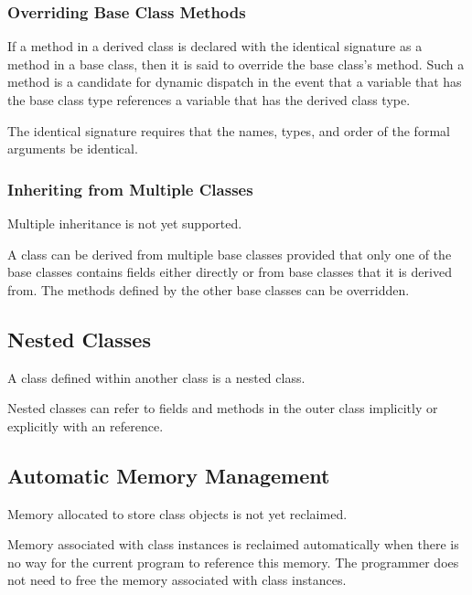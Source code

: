 \subsubsection{Overriding Base Class Methods}
\label{Overriding_Base_Class_Methods}

If a method in a derived class is declared with the identical
signature as a method in a base class, then it is said to override the
base class's method.  Such a method is a candidate for dynamic
dispatch in the event that a variable that has the base class type
references a variable that has the derived class type.

The identical signature requires that the names, types, and order of
the formal arguments be identical.

\subsubsection{Inheriting from Multiple Classes}
\label{Inheriting_from_Multiple_Classes}

\begin{status}
Multiple inheritance is not yet supported.
\end{status}

A class can be derived from multiple base classes provided that only
one of the base classes contains fields either directly or from base
classes that it is derived from.  The methods defined by the other
base classes can be overridden.

\subsection{Nested Classes}
\label{Nested_Classes}

A class defined within another class is a nested class.

Nested classes can refer to fields and methods in the outer class
implicitly or explicitly with an  reference.

\subsection{Automatic Memory Management}
\label{Automatic_Memory_Management}

\begin{status}
Memory allocated to store class objects is not yet reclaimed.
\end{status}

Memory associated with class instances is reclaimed automatically when
there is no way for the current program to reference this memory.  The
programmer does not need to free the memory associated with class
instances.

